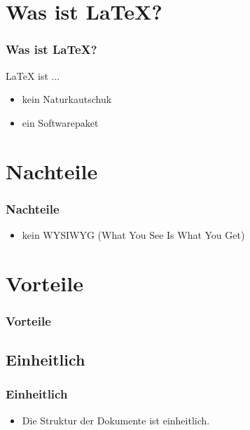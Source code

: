 \documentclass[xcolor=dvipsnames]{beamer}
\subtitle{Wissenschaftliche Arbeiten ohne Haarausfall} %
\institute{AKAD Pinneberg} %
\title{\Title}
\author{\Author}
\date{\today}
\begin{document}
\begin{frame}
    \titlepage
\end{frame}


\frame{\tableofcontents[hideallsubsections]} 

 

\section{Was ist \LaTeX{}?}
\begin{frame}
  \frametitle{Was ist \LaTeX{}?}
	\begin{block}{\LaTeX{} ist ... }	
		\begin{itemize}
  			\item kein Naturkautschuk
	  		\item ein Softwarepaket
		\end{itemize}
	\end{block}
\end{frame}

\section{Nachteile}
\begin{frame}
  \frametitle{Nachteile}
	\begin{alertblock}{}	
		\begin{itemize}
  			\item kein WYSIWYG (What You See Is What You Get)
		\end{itemize}
	\end{alertblock}
\end{frame}

\section{Vorteile}
\begin{frame}
  \frametitle{Vorteile}
 	 \tableofcontents[currentsection]
\end{frame}

\subsection{Einheitlich}
\begin{frame}
  \frametitle{Einheitlich}
	\begin{block}{}	
		\begin{itemize}
  			\item Die Struktur der Dokumente ist einheitlich.
		\end{itemize}
	\end{block}	
\end{frame}
\end{document}
